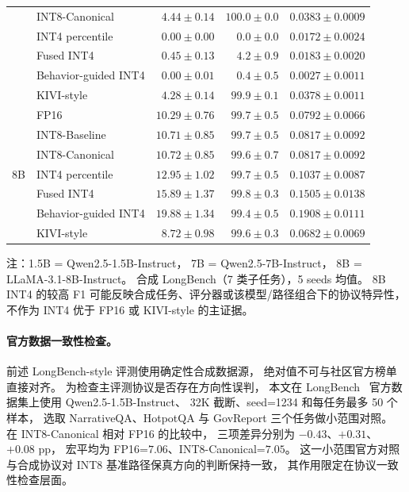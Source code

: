 \begin{table}[!htbp]
\begin{threeparttable}
\begin{tabular}{lp{3.4cm}rrr}
      & INT8-Canonical               & $4.44 \pm 0.14$ & $100.0 \pm 0.0$ & $0.0383 \pm 0.0009$ \\
      & INT4 percentile              & $0.00 \pm 0.00$ & $0.0 \pm 0.0$   & $0.0172 \pm 0.0024$ \\
      & Fused INT4                   & $0.45 \pm 0.13$ & $4.2 \pm 0.9$   & $0.0183 \pm 0.0020$ \\
      & Behavior-guided INT4         & $0.00 \pm 0.01$ & $0.4 \pm 0.5$   & $0.0027 \pm 0.0011$ \\
      & KIVI-style                   & $4.28 \pm 0.14$ & $99.9 \pm 0.1$  & $0.0378 \pm 0.0011$ \\
    \midrule
    \multirow{7}{*}{8B}
      & FP16                         & $10.29 \pm 0.76$ & $99.7 \pm 0.5$ & $0.0792 \pm 0.0066$ \\
      & INT8-Baseline                & $10.71 \pm 0.85$ & $99.7 \pm 0.5$ & $0.0817 \pm 0.0092$ \\
      & INT8-Canonical               & $10.72 \pm 0.85$ & $99.6 \pm 0.7$ & $0.0817 \pm 0.0092$ \\
      & INT4 percentile              & $12.95 \pm 1.02$ & $99.7 \pm 0.5$ & $0.1037 \pm 0.0087$ \\
      & Fused INT4                   & $15.89 \pm 1.37$ & $99.8 \pm 0.3$ & $0.1505 \pm 0.0138$ \\
      & Behavior-guided INT4         & $19.88 \pm 1.34$ & $99.4 \pm 0.5$ & $0.1908 \pm 0.0111$ \\
      & KIVI-style                   & $8.72 \pm 0.98$  & $99.6 \pm 0.3$ & $0.0682 \pm 0.0069$ \\
    \bottomrule
  \end{tabular}
  \begin{tablenotes}
    \footnotesize
    \item 注：1.5B = Qwen2.5-1.5B-Instruct，
    7B = Qwen2.5-7B-Instruct，
    8B = LLaMA-3.1-8B-Instruct。
    合成 LongBench（7 类子任务），5 seeds 均值。
    8B INT4 的较高 F1 可能反映合成任务、评分器或该模型/路径组合下的协议特异性，
    不作为 INT4 优于 FP16 或 KIVI-style 的主证据。
  \end{tablenotes}
  \end{threeparttable}
\end{table}

\paragraph{官方数据一致性检查。}
\label{sec:app-longbench-official}
前述 LongBench-style 评测使用确定性合成数据源，
绝对值不可与社区官方榜单直接对齐。
为检查主评测协议是否存在方向性误判，
本文在 LongBench~\cite{bai2024longbench} 官方数据集上使用 Qwen2.5-1.5B-Instruct、
32K 截断、seed=1234 和每任务最多 50 个样本，
选取 NarrativeQA、HotpotQA 与 GovReport 三个任务做小范围对照。
在 INT8-Canonical 相对 FP16 的比较中，
三项差异分别为 $-0.43$、$+0.31$、$+0.08$ pp，
宏平均为 FP16=$7.06$、INT8-Canonical=$7.05$。
这一小范围官方对照与合成协议对 INT8 基准路径保真方向的判断保持一致，
其作用限定在协议一致性检查层面。

